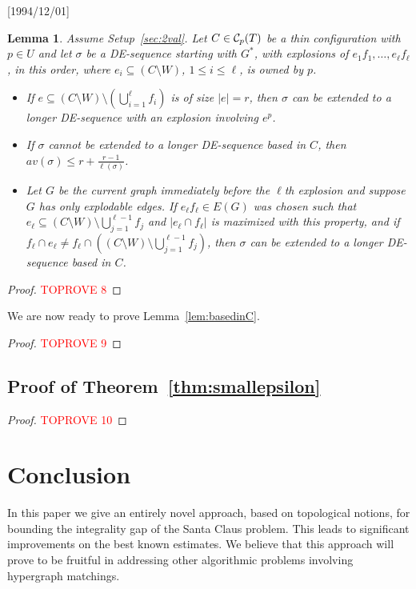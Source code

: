 \NeedsTeXFormat{LaTeX2e}[1994/12/01]\documentclass[letterpaper, 11pt]{article}
\newtheorem{lem}[thm]{Lemma}
\theoremstyle{definition}
\theoremstyle{remark}
\numberwithin{equation}{section}
\begin{document}
\begin{lem}\label{lem:multiexp}
Assume Setup~\ref{sec:2val}. Let $C\in {\cal C}_p(T)$ be a thin configuration with
  $p\in U$ and let $\sigma$ be a 
  DE-sequence starting with $G^*$, with explosions
  of $e_1f_1, \ldots , e_{\ell}f_{\ell}$, in this order, 
  where $e_i\subseteq (C\setminus W)$, $1\leq i \leq \ell$, is owned by $p$. 
\begin{itemize}
    \item[(a)] If $e\subseteq (C\setminus W) \setminus \left(\bigcup_{i=1}^{\ell}
  f_i\right)$ is of size $|e|=r$, then $\sigma$ can be extended to a
longer DE-sequence with an explosion involving $e^p$. 
\item[(b)] If $\sigma$ cannot be extended to a longer DE-sequence based in $C$, then 
$av(\sigma)\leq r+\frac{r-1}{\ell(\sigma)}$.
\item[(c)] Let $G$ be the current graph immediately before the $\ell$th
  explosion and suppose $G$ has only explodable edges.
If $e_{\ell}f_{\ell}\in E(G)$ was chosen such that $e_{\ell} \subseteq
(C\setminus W) \setminus \bigcup_{j=1}^{\ell-1}
  f_j$ and $|e_{\ell}\cap
f_{\ell}|$ is maximized with this property, and if $f_{\ell} \cap e_ {\ell} \neq f_{\ell}
  \cap \left((C\setminus W) \setminus \bigcup_{j=1}^{\ell-1}
  f_j\right)$, then $\sigma$ can be extended to a
longer DE-sequence based in $C$.
\end{itemize}
\end{lem}
\begin{proof}\textcolor{red}{TOPROVE 8}\end{proof}

We are now ready to prove Lemma~\ref{lem:basedinC}.

\begin{proof}\textcolor{red}{TOPROVE 9}\end{proof}

\subsection{Proof of Theorem~\ref{thm:smallepsilon}} \label{sec:smallepsilon} \begin{proof}\textcolor{red}{TOPROVE 10}\end{proof}


\section{Conclusion}

In this paper we give an entirely novel approach, based on topological
notions, for bounding the integrality gap of the Santa Claus problem. 
This leads to significant improvements on the best known estimates. 
We believe that this approach will prove to be fruitful in addressing
other algorithmic problems involving hypergraph matchings.
\end{document}

